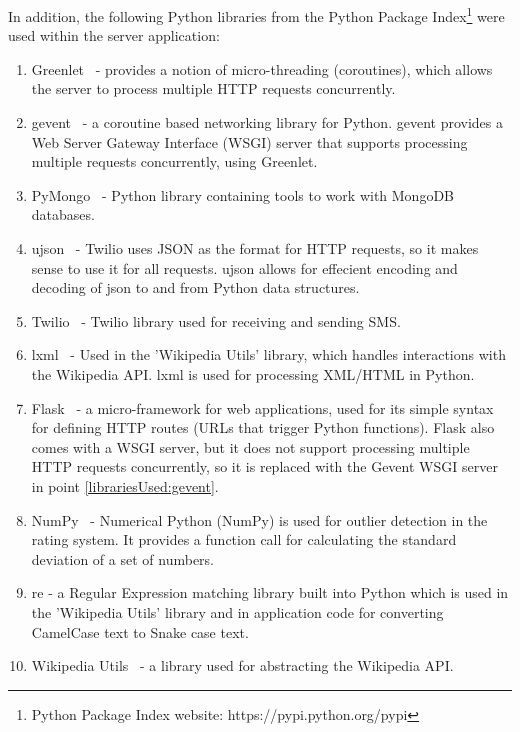 \documentclass[authoryearcitations]{UoYCSproject}
\begin{document}
In addition, the following Python libraries from the Python Package Index\footnote{Python Package Index website: https://pypi.python.org/pypi} were used within the server application:
\begin{enumerate}
    \item Greenlet~\cite{libraryGreenlet} - provides a notion of micro-threading (coroutines), which allows the server to process multiple HTTP requests concurrently.
    \item gevent~\cite{libraryGevent} \label{librariesUsed:gevent} - a coroutine based networking library for Python. gevent provides a Web Server Gateway Interface (WSGI) server that supports processing multiple requests concurrently, using Greenlet.
    \item PyMongo~\cite{libraryPyMongo} - Python library containing tools to work with MongoDB databases.
    \item ujson~\cite{libraryUjson} - Twilio uses JSON as the format for HTTP requests, so it makes sense to use it for all requests. ujson allows for effecient encoding and decoding of json to and from Python data structures.
    \item Twilio~\cite{libraryTwilio} - Twilio library used for receiving and sending SMS.
    \item lxml~\cite{libraryLxml} - Used in the 'Wikipedia Utils' library, which handles interactions with the Wikipedia API. lxml is used for processing XML/HTML in Python.
    \item Flask~\cite{libraryFlask} - a micro-framework for web applications, used for its simple syntax for defining HTTP routes (URLs that trigger Python functions). Flask also comes with a WSGI server, but it does not support processing multiple HTTP requests concurrently, so it is replaced with the Gevent WSGI server in point \ref{librariesUsed:gevent}.
    \item NumPy~\cite{libraryNumPy} - Numerical Python (NumPy) is used for outlier detection in the rating system. It provides a function call for calculating the standard deviation of a set of numbers.
    \item re - a Regular Expression matching library built into Python which is used in the 'Wikipedia Utils' library and in application code for converting CamelCase text to Snake case text.
    \item Wikipedia Utils~\cite{libraryWikipediaUtils} - a library used for abstracting the Wikipedia API.
\end{enumerate}
\end{document}
